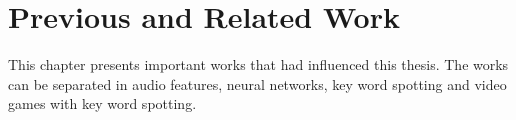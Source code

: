 
\chapter{Previous and Related Work}\label{sec:prev}
This chapter presents important works that had influenced this thesis.
The works can be separated in audio features, neural networks, key word spotting and video games with key word spotting.







